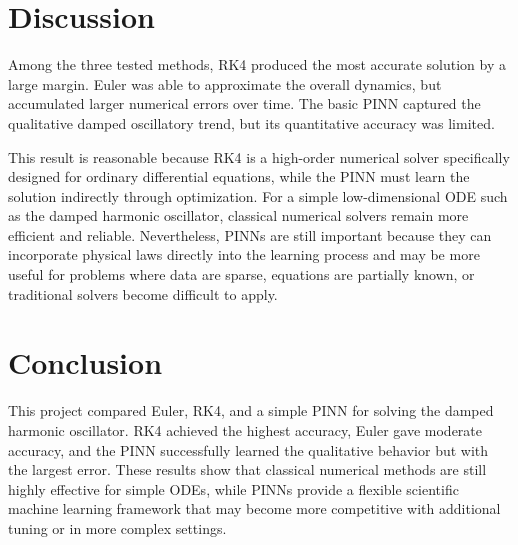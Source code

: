 \documentclass[10pt]{article}
\begin{document}
\section*{Discussion}
Among the three tested methods, RK4 produced the most accurate solution by a large margin. Euler was able to approximate the overall dynamics, but accumulated larger numerical errors over time. The basic PINN captured the qualitative damped oscillatory trend, but its quantitative accuracy was limited.

This result is reasonable because RK4 is a high-order numerical solver specifically designed for ordinary differential equations, while the PINN must learn the solution indirectly through optimization. For a simple low-dimensional ODE such as the damped harmonic oscillator, classical numerical solvers remain more efficient and reliable. Nevertheless, PINNs are still important because they can incorporate physical laws directly into the learning process and may be more useful for problems where data are sparse, equations are partially known, or traditional solvers become difficult to apply.

\section*{Conclusion}
This project compared Euler, RK4, and a simple PINN for solving the damped harmonic oscillator. RK4 achieved the highest accuracy, Euler gave moderate accuracy, and the PINN successfully learned the qualitative behavior but with the largest error. These results show that classical numerical methods are still highly effective for simple ODEs, while PINNs provide a flexible scientific machine learning framework that may become more competitive with additional tuning or in more complex settings.
\end{document}
